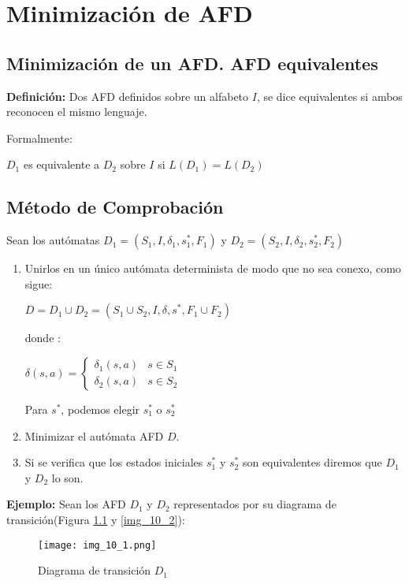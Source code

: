 \chapter{Minimización de AFD}

\section{Minimización de un AFD. AFD equivalentes}

\textbf{Definición: }Dos AFD definidos sobre un alfabeto $I$, se dice equivalentes si ambos reconocen el mismo lenguaje.

Formalmente:

$D_1$ es equivalente a $D_2$ sobre $I$ si $L(D_1)=L(D_2)$

\section{Método de Comprobación}

Sean los autómatas $D_1=(S_1,I,\delta_1,s_1^*,F_1)$ y $D_2=(S_2,I,\delta_2,s_2^*,F_2)$

\begin{enumerate}
\item Unirlos en un único autómata determinista de modo que no sea conexo, como sigue:

$D=D_1\cup D_2=(S_1\cup S_2,I,\delta,s^*,F_1\cup F_2)$

donde :

$\delta(s,a)=\left\{ \begin{array}{ll} 
\delta_1(s,a) 	&	s\in S_1	\\
\delta_2(s,a)	& 	s\in S_2	\end{array}\right.$

Para $s^*$, podemos elegir $s_1^*$ o $s_2^*$

\item Minimizar el autómata AFD $D$.
\item Si se verifica que los estados iniciales $s_1^*$ y $s_2^*$ son equivalentes diremos que $D_1$ y $D_2$ lo son.

\end{enumerate}

\textbf{Ejemplo: }Sean los AFD $D_1$ y $D_2$ representados por su diagrama de transición(Figura \ref{img_10_1} y \ref{img_10_2}):

\begin{figure}[h!]
\centering
\texttt{[image: img\_10\_1.png]}
\caption{Diagrama de transición $D_1$}\label{img_10_1}
\end{figure}

